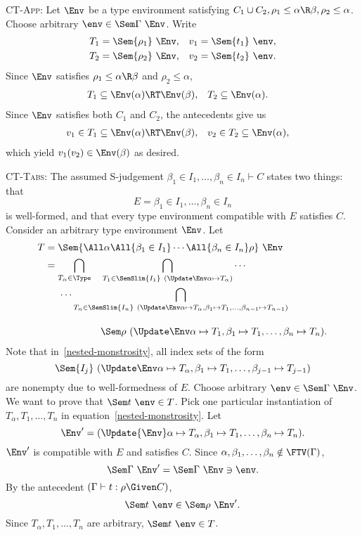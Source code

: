 \documentclass{amsart}
\begin{document}
\textsc{CT-App}: Let $\Env$ be a type environment satisfying
$C_1\cup C_2,\rho_1\le\alpha\R\beta,\rho_2\le\alpha$. Choose
arbitrary $\env\in\Sem\Gamma~\Env$. Write
\begin{align*}
T_1&=\Sem{\rho_1}~\Env,&
v_1&=\Sem{t_1}~\env,\\
T_2&=\Sem{\rho_2}~\Env,&
v_2&=\Sem{t_2}~\env.
\end{align*}
Since $\Env$ satisfies $\rho_1\le\alpha\R\beta$ and
$\rho_2\le\alpha$,
\begin{align*}
T_1&\subseteq \Env(\alpha)\RT\Env(\beta), &
T_2&\subseteq \Env(\alpha).
\end{align*}
Since $\Env$ satisfies both $C_1$ and $C_2$, the antecedents give
us
\begin{align*}
v_1&\in T_1 \subseteq \Env(\alpha)\RT\Env(\beta), &
v_2&\in T_2 \subseteq \Env(\alpha),
\end{align*}
which yield $v_1(v_2)\in\Env(\beta)$ as desired.

\textsc{CT-Tabs}: The assumed S-judgement $\beta_1\in
I_1,\ldots,\beta_n\in I_n\vdash C$ states two things: that
\[
E=\beta_1\in I_1,\ldots,\beta_n\in I_n
\]
is well-formed, and that every type environment compatible with
$E$ satisfies $C$. Consider an arbitrary type environment
$\Env$. Let
\begin{align}
\notag
T&=\Sem{\All\alpha\All{\beta_1\in I_1}\cdots\All{\beta_n\in I_n}\rho}~\Env\\
&=
\bigcap_{T_\alpha\in\Type\quad}
\bigcap_{T_1\in\SemSlim{I_1}~(\Update\Env\alpha\mapsto T_\alpha)}
\cdots
\notag\\
&\hspace{0.5cm}\cdots
\bigcap_{T_n\in\SemSlim{I_n}~(\Update\Env
\alpha\mapsto T_\alpha,\beta_1\mapsto T_1,\ldots,
\beta_{n-1}\mapsto T_{n-1}
)}
\label{nested-monstrosity}
\\[1em]
&\hspace{2cm}
\Sem\rho~(\Update\Env
\alpha\mapsto T_1,\beta_1\mapsto T_1,\ldots,\beta_n\mapsto T_n).
\notag
\end{align}
Note that in~\eqref{nested-monstrosity}, all index sets of the
form
\[
\Sem{I_j}~(\Update\Env\alpha\mapsto T_\alpha,\beta_1\mapsto T_1,\ldots,
\beta_{j-1}\mapsto T_{j-1})
\]
are nonempty due to well-formedness of $E$. Choose arbitrary
$\env \in \Sem\Gamma~\Env$. We want to prove that $\Sem
t~\env \in T$. Pick one particular instantiation of
$T_\alpha,T_1,\ldots,T_n$ in equation~\eqref{nested-monstrosity}.
Let
\[
\Env'=(\Update{\Env}\alpha\mapsto T_\alpha,\beta_1\mapsto T_1,
\ldots,\beta_n\mapsto T_n).
\]
$\Env'$ is compatible with $E$ and satisfies $C$. Since
$\alpha,\beta_1,\ldots,\beta_n\notin\FTV(\Gamma)$,
\[
\Sem\Gamma~\Env'=\Sem\Gamma~\Env\ni\env.
\]
By the antecedent $(\Gamma\vdash t:\rho\Given C)$,
\[
\Sem t~\env\in\Sem\rho~\Env'.
\]
Since $T_\alpha,T_1,\ldots,T_n$ are arbitrary, $\Sem t~\env\in T$.
\end{document}
